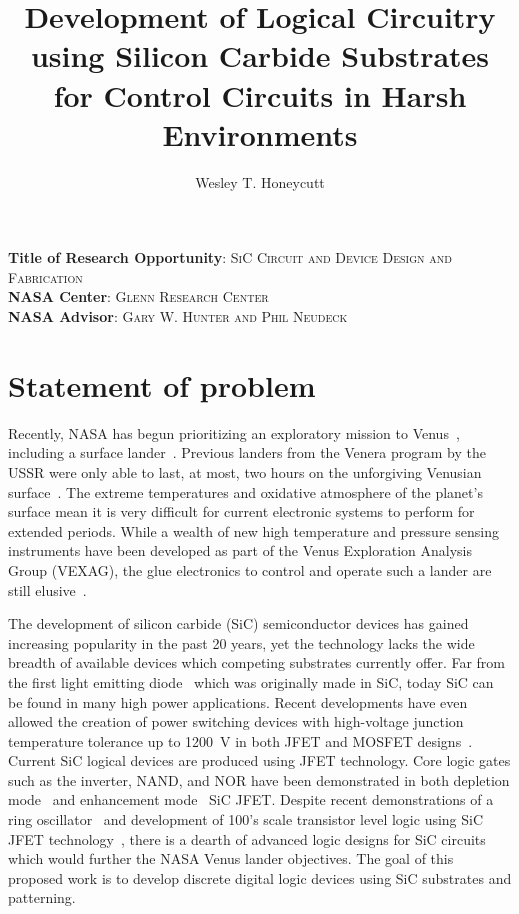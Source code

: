 \documentclass[12pt]{amsart}
\title[Logical Circuitry using SiC for Control in Harsh Environments]{Development of Logical Circuitry using Silicon Carbide Substrates for Control Circuits in Harsh Environments}  %
\author{Wesley T. Honeycutt}  %
\begin{document}
 	\maketitle
 	
 	\doublespacing
 	
 	
 	\noindent
 	\textbf{Title of Research Opportunity}: \textsc{SiC Circuit and Device Design and Fabrication}\\
 	\smallskip
 	\noindent
 	\textbf{NASA Center}: \textsc{Glenn Research Center}\\
 	\smallskip
 	\noindent
 	\textbf{NASA Advisor}: \textsc{Gary W. Hunter and Phil Neudeck}\\
 	\smallskip

 	\section{Statement of problem}
 	
 	Recently, NASA has begun prioritizing an exploratory mission to Venus~\cite{herrick2014goals}, including a surface lander~\cite{kremic2017long}.  Previous landers from the Venera program by the USSR were only able to last, at most, two hours on the unforgiving Venusian surface~\cite{hunten1983venus}.  The extreme temperatures and oxidative atmosphere of the planet's surface mean it is very difficult for current electronic systems to perform for extended periods.  While a wealth of new high temperature and pressure sensing instruments have been developed as part of the Venus Exploration Analysis Group (VEXAG), the glue electronics to control and operate such a lander are still elusive~\cite{balcerski_venus_2015}.  
 	
 	The development of silicon carbide (SiC) semiconductor devices has gained increasing popularity in the past 20 years, yet the technology lacks the wide breadth of available devices which competing substrates currently offer.  Far from the first light emitting diode~\cite{round_note_1907,losev_luminous_1927} which was originally made in SiC, today SiC can be found in many high power applications.  Recent developments have even allowed the creation of power switching devices with high-voltage junction temperature tolerance up to \SI{1200}{\volt} in both JFET and MOSFET designs~\cite{siemieniec_1200v_2011,mino_gate_2003}.  Current SiC logical devices are produced using JFET technology.  Core logic gates such as the inverter, NAND, and NOR have been demonstrated in both depletion mode~\cite{krasowski_n_2010} and enhancement mode~\cite{habib_complementary_2013} SiC JFET.  Despite recent demonstrations of a ring oscillator~\cite{whate} and development of 100's scale transistor level logic using SiC JFET technology~\cite{neudeck_first-order_2016}, there is a dearth of advanced logic designs for SiC circuits which would further the NASA Venus lander objectives.  The goal of this proposed work is to develop discrete digital logic devices using SiC substrates and patterning. 
    
\end{document}
